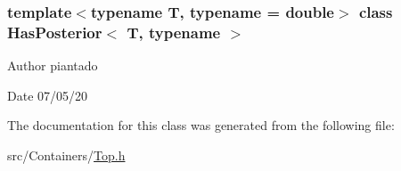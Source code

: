 \subsubsection*{template$<$typename T, typename = double$>$\newline
class Has\+Posterior$<$ T, typename $>$}

\begin{DoxyAuthor}{Author}
piantado 
\end{DoxyAuthor}
\begin{DoxyDate}{Date}
07/05/20 
\end{DoxyDate}


The documentation for this class was generated from the following file\+:\begin{DoxyCompactItemize}
\item 
src/\+Containers/\hyperlink{_top_8h}{Top.\+h}\end{DoxyCompactItemize}

